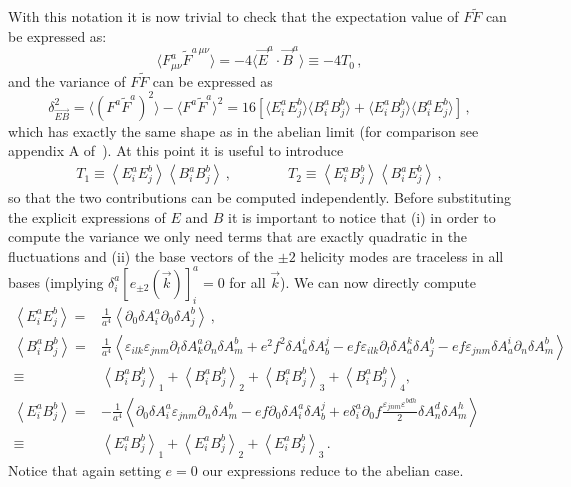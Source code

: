 \noindent With this notation it is now trivial to check that the expectation value of $F \tilde{F}$ can be expressed as:
\begin{equation}
  \langle F^a_{\mu \nu} \tilde{F}^{a \, \mu \nu} \rangle = - 4 \langle \vec{E}^a \cdot \vec{B}^{a } \rangle \equiv  - 4 T_0 \, ,
\end{equation}
and the variance of $F \tilde{F}$ can be expressed as
\begin{equation}
  \delta_{\vec{EB}}^2 = \langle ( F^a \tilde{F}^a )^2 \rangle  -  \langle  F^a \tilde{F}^a  \rangle ^2 = 16\left[  \langle  E_i^a E_j^b \rangle \langle B_i^a B_j^b \rangle + \langle E_i^a B_j^b \rangle \langle B_i^a E_j^b \rangle \right] \, ,
\end{equation}
which has exactly the same shape as in the abelian limit (for comparison see appendix A of~\cite{Linde:2012bt}). At this point it is useful to introduce 
\begin{eqnarray}
  T_1  \equiv \left \langle E^a_{i}  E^b_{j} \right \rangle \left \langle B^a_{i}  B^b_{j} \right \rangle \, , \qquad \qquad T_2  \equiv \left \langle E^a_{i} B^b_{j} \right \rangle \left \langle B^a_{i}  E^b_{j} \right \rangle \, ,
\end{eqnarray}
so that the two contributions can be computed independently. Before substituting the explicit expressions of $E$ and $B$ it is important to notice that (i) in order to compute the variance we only need terms that are exactly quadratic in the fluctuations and (ii)  the base vectors of the $\pm 2$ helicity modes are traceless in all bases (implying $\delta^a_i \left[e_{\pm2} (\vec{k})\right]^a_i = 0 $ for all $\vec{k}$). 
% 
We can now  directly compute 
\begin{align}
  \left \langle E^a_{i}  E^b_{j} \right \rangle  =& \frac{1}{a^4} \left \langle \partial_0 \delta A^a_i \partial_0 \delta A^b_j \right \rangle \, , \\
  \left \langle B^a_{i}  B^b_{j} \right \rangle =& \frac{1}{a^4} \left \langle  \varepsilon_{ilk} \varepsilon_{jnm} \partial_l   \delta A^a_k  \partial_n \delta A^b_m + e^2 f^2 \delta A^i_a \delta A^j_b  - e f \varepsilon_{ilk} \partial_l \delta A^k_a \delta A^b_j  - e f \varepsilon_{jnm}  \delta A^i_a \partial_n \delta A^b_m \right \rangle \nonumber \\
  \equiv&  \left \langle B^a_{i}  B^b_{j} \right \rangle_1 +  \left \langle B^a_{i}  B^b_{j} \right \rangle_2 +  \left \langle B^a_{i}  B^b_{j} \right \rangle_3 +  \left \langle B^a_{i}  B^b_{j} \right \rangle_4 , \\
  \left \langle E^a_{i} B^b_{j} \right \rangle =& - \frac{1}{a^4} \left \langle \partial_0 \delta A^a_i \varepsilon_{jnm} \partial_n \delta A^b_m  - e f  \partial_0 \delta A^a_i \delta A^j_b +  e \delta^a_i \partial_0 f \frac{\varepsilon_{jnm} \varepsilon^{bdh}}{2} \delta A^d_n  \delta A^h_m \right \rangle \nonumber \\
  \equiv&  \left \langle E^a_{i}  B^b_{j} \right \rangle_1 +  \left \langle E^a_{i}  B^b_{j} \right \rangle_2 +  \left \langle E^a_{i}  B^b_{j} \right \rangle_3 \, .
\end{align}
Notice that again setting $e = 0$ our expressions reduce to the abelian case. 

